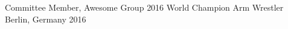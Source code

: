 

\begin{cvhonors}

  \cvhonor
    {Committee Member, Awesome Group} %
    {2016 World Champion Arm Wrestler} %
    {Berlin, Germany} %
    {2016} %

\end{cvhonors}
